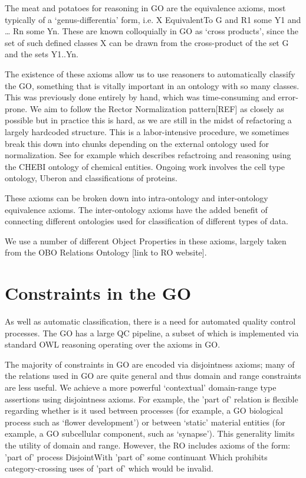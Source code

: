 \documentclass{llncs}
\begin{document}
The meat and potatoes for reasoning in GO are the equivalence axioms, most typically of a ‘genus-differentia’ form, i.e. X EquivalentTo G and R1 some Y1 and … Rn some Yn. These are known colloquially in GO as ‘cross products’, since the set of such defined classes X can be drawn from the cross-product of the set G and the sets Y1..Yn.

The existence of these axioms allow us to use reasoners to automatically classify the GO, something that is vitally important in an ontology with so many classes. This was previously done entirely by hand, which was time-consuming and error-prone. We aim to follow the Rector Normalization pattern[REF] as closely as possible but in practice this is hard, as we are still in the midst of refactoring a largely hardcoded structure. This is a labor-intensive procedure, we sometimes break this down into chunks depending on the external ontology used for normalization. See for example \cite{Hill2013} which describes refactroing and reasoning using the CHEBI ontology of chemical entities. Ongoing work involves the cell type ontology, Uberon and classifications of proteins.

These axioms can be broken down into intra-ontology and inter-ontology equivalence axioms. The inter-ontology axioms have the added benefit of connecting different ontologies used for classification of different types of data.

We use a number of different Object Properties in these axioms, largely taken from the OBO Relations Ontology [link to RO website].

\section{Constraints in the GO}


As well as automatic classification, there is a need for automated quality control processes. The GO has a large QC pipeline, a subset of which is implemented via standard OWL reasoning operating over the axioms in GO.

The majority of constraints in GO are encoded via disjointness axioms; many of the relations used in GO are quite general and thus domain and range constraints are less useful. We achieve a more powerful ‘contextual’ domain-range type assertions using disjointness axioms. For example, the 'part of' relation is flexible regarding whether is it used between processes (for example, a GO biological process such as ‘flower development’) or between ‘static’ material entities (for example, a GO subcellular component, such as ‘synapse’). This generality limits the utility of domain and range. However, the RO includes axioms of the form:
    'part of' process DisjointWith 'part of' some continuant
Which prohibits category-crossing uses of 'part of' which would be invalid.
\end{document}

